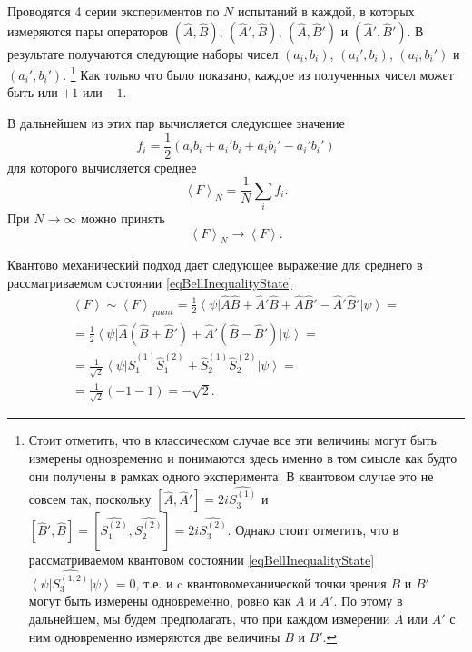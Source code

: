 Проводятся 4 серии экспериментов по $N$ испытаний в каждой, в которых
измеряются пары операторов $\left(\hat{A},\hat{B}\right)$,
$\left(\hat{A}',\hat{B}\right)$, $\left(\hat{A},\hat{B}'\right)$ и
$\left(\hat{A}',\hat{B}'\right)$. В результате получаются следующие
наборы чисел $\left(a_i, b_i\right)$, $\left(a_i', b_i\right)$, $\left(a_i, b_i'\right)$ и
$\left(a_i', b_i'\right)$.
\footnote{
  Стоит отметить, что в классическом случае все эти величины могут
  быть измерены одновременно и понимаются здесь именно в том смысле
  как будто они получены в рамках одного эксперимента.
  В квантовом случае это не совсем так,
  поскольку $\left[\hat{A}, \hat{A}'\right] = 2 i \hat{S_3^{(1)}}$ и
  $\left[\hat{B}', \hat{B}\right] =
  \left[\hat{S_1^{(2)}}, \hat{S_2^{(2)}}\right] =
  2 i \hat{S_3^{(2)}}$. Однако стоит отметить, что в рассматриваемом
  квантовом состоянии \eqref{eqBellInequalityState}
  $\left<\psi\right|\hat{S_3^{(1,2)}}\left|\psi\right> = 0$, т.е. и c
  квантовомеханической точки зрения $B$ и $B'$ могут быть измерены
  одновременно, ровно как $A$ и $A'$. По этому в дальнейшем, мы будем
  предполагать, что при каждом измерении $A$ или $A'$ с ним
  одновременно измеряются две величины $B$ и $B'$.
}
Как только что было показано, каждое
из полученных чисел может быть или $+1$ или $-1$.

В дальнейшем из этих пар вычисляется следующее значение
\begin{equation}
f_i = \frac{1}{2}\left(
a_i b_i + a_i' b_i + a_i b_i' - a_i' b_i'
\right)
\nonumber
\end{equation}
для которого вычисляется среднее
\begin{equation}
\left<F\right>_N = \frac{1}{N}\sum_i f_i.
\label{eqEntangFmain}
\end{equation}
При $N \rightarrow \infty$ можно принять
\begin{equation}
\left<F\right>_N \rightarrow \left<F\right>.
\nonumber
\end{equation}

Квантово механический подход дает следующее выражение для среднего в
рассматриваемом состоянии \eqref{eqBellInequalityState} 
\begin{eqnarray}
 \left<F\right> \sim \left<F\right>_{quant} 
=\frac{1}{2}
\left<\psi\right|
\hat{A}\hat{B} + \hat{A}'\hat{B} + \hat{A}\hat{B}' - \hat{A}'\hat{B}'
\left|\psi\right> = 
\nonumber \\
=\frac{1}{2}
\left<\psi\right|
\hat{A}\left(\hat{B} + \hat{B}'\right) + \hat{A}' \left(\hat{B}  -
\hat{B}' \right)
\left|\psi\right> = 
\nonumber \\
= \frac{1}{\sqrt{2}}
\left<\psi\right|
\hat{S}_1^{(1)}\hat{S}_1^{(2)} + \hat{S}_2^{(1)}\hat{S}_2^{(2)}
\left|\psi\right> =
\nonumber \\
= \frac{1}{\sqrt{2}}
\left(-1 - 1\right) = - \sqrt{2}.
\label{eqEntangQuant}
\end{eqnarray}

